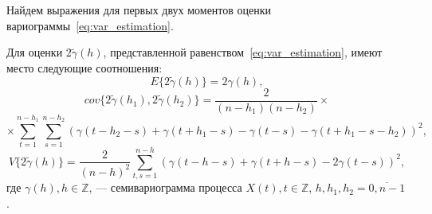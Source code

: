 Найдем выражения для первых двух моментов оценки вариограммы~\eqref{eq:var_estimation}.
\begin{Theorem}
	Для оценки $ 2 \tilde{\gamma}(h) $, представленной равенством~\eqref{eq:var_estimation}, имеют место следующие соотношения:
	\begin{equation}
	\label{eq:est_ex}
		E \{2 \tilde{\gamma}(h) \} = 2 \gamma(h), %
	\end{equation}
	\begin{equation*}
		cov \{ 2 \tilde{\gamma}(h_1), 2 \tilde{\gamma}(h_2) \} = \frac{2}{(n - h_1)(n - h_2)} \times
	\end{equation*}
	\begin{equation}
	\label{eq:est_cov}
		 \times \sum_{t = 1}^{n - h_1}\sum_{s = 1}^{n - h_2} {(\gamma(t - h_2 - s) + \gamma(t + h_1 - s) - \gamma(t - s) - \gamma(t + h_1 - s - h_2))}^2,
	\end{equation}
	\begin{equation}
	\label{eq:est_var}
		V \{ 2 \tilde{\gamma}(h) \} = \frac{2}{{(n - h)}^2}\sum_{t,s = 1}^{n - h} {( \gamma(t - h - s) + \gamma(t + h - s) - 2\gamma(t - s) )}^2,
	\end{equation}
	где $ \gamma(h), h \in \mathbb{Z} $, --- семивариограмма процесса $ X(t), t \in \mathbb{Z}$, $ h, h_1, h_2 = \overline{0, n - 1} $.
\end{Theorem}
